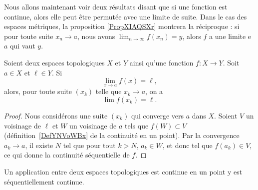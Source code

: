 \begin{normaltext}
    Nous allons maintenant voir deux résultats disant que si une fonction est continue, alors elle peut être permutée avec une limite de suite. Dans le cas des espaces métriques, la proposition \ref{PropXIAQSXr} montrera la réciproque : si pour toute suite \(x_n\to a\), nous avons \( \lim_{n\to \infty} f(x_n)=y\), alors \( f\) a une limite e \( a\) qui vaut \( y\).
\end{normaltext}

\begin{proposition} \label{fContEstSeqCont}
  Soient deux espaces topologiques \( X\) et \( Y\) ainsi qu'une fonction \( f\colon X\to Y\). Soit \( a\in X\) et \( \ell\in Y\). Si
  \begin{equation}
    \lim_{x\to a} f(x)=\ell,
  \end{equation}
  alors, pour toute suite \( (x_k) \) telle que \( x_k \to a \), on a
  \begin{equation}
    \lim f(x_k)=\ell.
  \end{equation}
\end{proposition}

\begin{proof}
  Nous considérons une suite \( (x_k)\) qui converge vers \( a\) dans \( X\). Soient \( V\) un voisinage de \( \ell \) et \( W\) un voisinage de \( a\) tels que \( f(W)\subset V\) (définition~\ref{DefYNVoWBx} de la continuité en un point). Par la convergence \( a_k\to a\),  il existe \( N\) tel que pour tout \( k>N\), \( a_k\in W\), et donc tel que \( f(a_k)\in V\), ce qui donne la continuité séquentielle de \( f\).
\end{proof}

\begin{corollary}		\label{PropFnContParSuite}
    Un application entre deux espaces topologiques est continue en un point y est séquentiellement continue.
\end{corollary}

